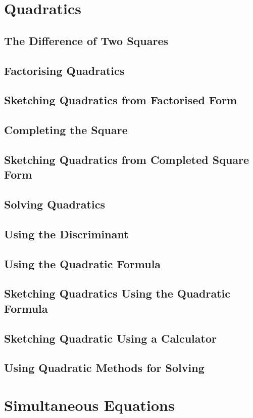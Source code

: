 \documentclass[../maths.tex]{subfiles}
\begin{document}
\section{Quadratics}
\subsection*{The Difference of Two Squares}
\subsection*{Factorising Quadratics}
\subsection*{Sketching Quadratics from Factorised Form}
\subsection*{Completing the Square}
\subsection*{Sketching Quadratics from Completed Square Form}
\subsection*{Solving Quadratics}
\subsection*{Using the Discriminant}
\subsection*{Using the Quadratic Formula}
\subsection*{Sketching Quadratics Using the Quadratic Formula}
\subsection*{Sketching Quadratic Using a Calculator}
\subsection*{Using Quadratic Methods for Solving}
\section{Simultaneous Equations}
\end{document}

